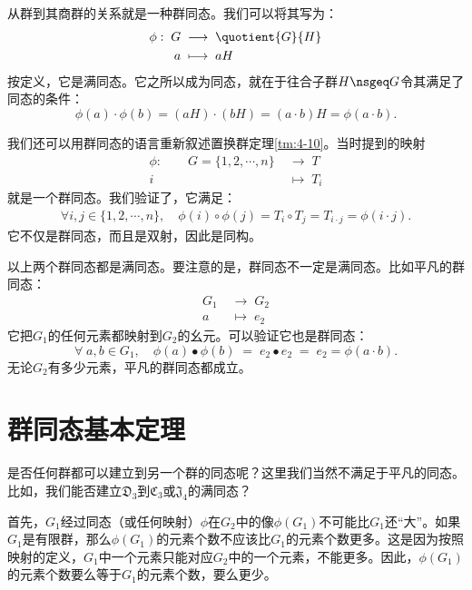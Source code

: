 \documentclass[12pt,UTF8,fontset=none]{ctexbook}
\begin{document}
从群到其商群的关系就是一种群同态。我们可以将其写为：
\begin{align*}
    \phi:\; G\;&\longrightarrow\; \quotient{G}{H}\\
            a\;&\longmapsto \; aH
\end{align*}
按定义，它是满同态。它之所以成为同态，就在于往合子群$H\nsgeq G$令其满足了同态的条件：
\[\phi(a)\cdot\phi(b) = (aH)\cdot(bH) = (a\cdot b)H = \phi(a\cdot b).\]

我们还可以用群同态的语言重新叙述置换群定理\ref{tm:4-10}。当时提到的映射
\begin{align*}
    \phi:\qquad G = \{1,2,\cdots,n\}\; &\longrightarrow \;T\\
    i \qquad\; &\longmapsto \; T_i
\end{align*}
就是一个群同态。我们验证了，它满足：
\begin{align*}
    \forall i,j\in\{1,2,\cdots,n\},\quad\phi(i)\circ\phi(j) = T_i\circ T_j = T_{i\cdot j} = \phi(i\cdot j).
\end{align*}
它不仅是群同态，而且是双射，因此是同构。

以上两个群同态都是满同态。要注意的是，群同态不一定是满同态。比如平凡的群同态：
\begin{align*}
   G_1\;&\longrightarrow\; G_2\\
            a\;&\longmapsto \; e_2
\end{align*}
它把$G_1$的任何元素都映射到$G_2$的幺元。可以验证它也是群同态：
\[\forall\;a,b\in G_1,\quad \phi(a)\bullet \phi(b) \; = \; e_2\bullet e_2 \; = \; e_2 = \phi(a \cdot b).\]
无论$G_2$有多少元素，平凡的群同态都成立。

\section{群同态基本定理}
是否任何群都可以建立到另一个群的同态呢？这里我们当然不满足于平凡的同态。比如，我们能否建立$\mathfrak{D}_3$到$\mathfrak{C}_3$或$\mathfrak{J}_4$的满同态？

首先，$G_1$经过同态（或任何映射）$\phi$在$G_2$中的像$\phi(G_1)$不可能比$G_1$还“大”。如果$G_1$是有限群，那么$\phi(G_1)$的元素个数不应该比$G_1$的元素个数更多。这是因为按照映射的定义，$G_1$中一个元素只能对应$G_2$中的一个元素，不能更多。因此，$\phi(G_1)$的元素个数要么等于$G_1$的元素个数，要么更少。
\end{document}
